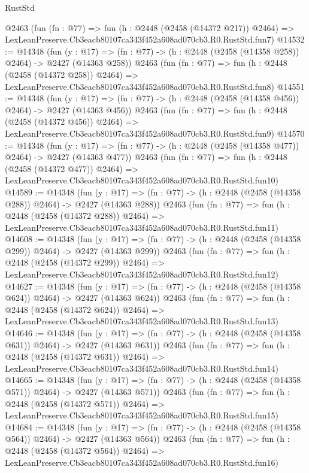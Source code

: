 \begin{lexlean}{RustStd}
\begin{coremodule}
    @2463
    (fun (fn : @77) =>
    fun (h : @2448 (@2458 (@14372 @217)) @2464) =>
    LexLeanPreserve.Cb3eacb80107ca343f452a608ad070cb3.R0.RustStd.fun7)
@14532 := @14348
    (fun (y : @17) => (fn : @77) -> (h : @2448 (@2458 (@14358 @258)) @2464) -> @2427 (@14363 @258))
    @2463
    (fun (fn : @77) =>
    fun (h : @2448 (@2458 (@14372 @258)) @2464) =>
    LexLeanPreserve.Cb3eacb80107ca343f452a608ad070cb3.R0.RustStd.fun8)
@14551 := @14348
    (fun (y : @17) => (fn : @77) -> (h : @2448 (@2458 (@14358 @456)) @2464) -> @2427 (@14363 @456))
    @2463
    (fun (fn : @77) =>
    fun (h : @2448 (@2458 (@14372 @456)) @2464) =>
    LexLeanPreserve.Cb3eacb80107ca343f452a608ad070cb3.R0.RustStd.fun9)
@14570 := @14348
    (fun (y : @17) => (fn : @77) -> (h : @2448 (@2458 (@14358 @477)) @2464) -> @2427 (@14363 @477))
    @2463
    (fun (fn : @77) =>
    fun (h : @2448 (@2458 (@14372 @477)) @2464) =>
    LexLeanPreserve.Cb3eacb80107ca343f452a608ad070cb3.R0.RustStd.fun10)
@14589 := @14348
    (fun (y : @17) => (fn : @77) -> (h : @2448 (@2458 (@14358 @288)) @2464) -> @2427 (@14363 @288))
    @2463
    (fun (fn : @77) =>
    fun (h : @2448 (@2458 (@14372 @288)) @2464) =>
    LexLeanPreserve.Cb3eacb80107ca343f452a608ad070cb3.R0.RustStd.fun11)
@14608 := @14348
    (fun (y : @17) => (fn : @77) -> (h : @2448 (@2458 (@14358 @299)) @2464) -> @2427 (@14363 @299))
    @2463
    (fun (fn : @77) =>
    fun (h : @2448 (@2458 (@14372 @299)) @2464) =>
    LexLeanPreserve.Cb3eacb80107ca343f452a608ad070cb3.R0.RustStd.fun12)
@14627 := @14348
    (fun (y : @17) => (fn : @77) -> (h : @2448 (@2458 (@14358 @624)) @2464) -> @2427 (@14363 @624))
    @2463
    (fun (fn : @77) =>
    fun (h : @2448 (@2458 (@14372 @624)) @2464) =>
    LexLeanPreserve.Cb3eacb80107ca343f452a608ad070cb3.R0.RustStd.fun13)
@14646 := @14348
    (fun (y : @17) => (fn : @77) -> (h : @2448 (@2458 (@14358 @631)) @2464) -> @2427 (@14363 @631))
    @2463
    (fun (fn : @77) =>
    fun (h : @2448 (@2458 (@14372 @631)) @2464) =>
    LexLeanPreserve.Cb3eacb80107ca343f452a608ad070cb3.R0.RustStd.fun14)
@14665 := @14348
    (fun (y : @17) => (fn : @77) -> (h : @2448 (@2458 (@14358 @571)) @2464) -> @2427 (@14363 @571))
    @2463
    (fun (fn : @77) =>
    fun (h : @2448 (@2458 (@14372 @571)) @2464) =>
    LexLeanPreserve.Cb3eacb80107ca343f452a608ad070cb3.R0.RustStd.fun15)
@14684 := @14348
    (fun (y : @17) => (fn : @77) -> (h : @2448 (@2458 (@14358 @564)) @2464) -> @2427 (@14363 @564))
    @2463
    (fun (fn : @77) =>
    fun (h : @2448 (@2458 (@14372 @564)) @2464) =>
    LexLeanPreserve.Cb3eacb80107ca343f452a608ad070cb3.R0.RustStd.fun16)

\end{coremodule}
\end{lexlean}
